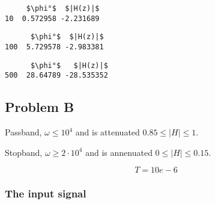 \documentclass[11pt]{article}
\begin{document}
    
    
    \begin{verbatim}
     $\phi°$  $|H(z)|$
10  0.572958 -2.231689
    \end{verbatim}

    
    
    \begin{verbatim}
      $\phi°$  $|H(z)|$
100  5.729578 -2.983381
    \end{verbatim}

    
    
    \begin{verbatim}
      $\phi°$   $|H(z)|$
500  28.64789 -28.535352
    \end{verbatim}

    
    \hypertarget{problem-b}{%
\subsection{Problem B}\label{problem-b}}

Passband, \(\omega \leq 10^4\) and is attenuated \(0.85\leq |H|\leq 1\).

Stopband, \(\omega \geq 2\cdot 10^4\) and is annenuated
\(0 \leq |H| \leq 0.15\).

\[T = 10e-6\]

\hypertarget{the-input-signal}{%
\subsubsection{The input signal}\label{the-input-signal}}
\end{document}
